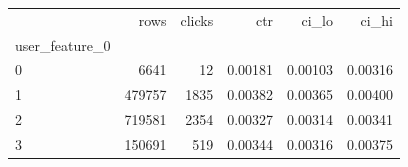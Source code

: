 \begin{tabular}{lrrrrr}
\toprule
 & rows & clicks & ctr & ci\_lo & ci\_hi \\
user\_feature\_0 &  &  &  &  &  \\
\midrule
0 & 6641 & 12 & 0.00181 & 0.00103 & 0.00316 \\
1 & 479757 & 1835 & 0.00382 & 0.00365 & 0.00400 \\
2 & 719581 & 2354 & 0.00327 & 0.00314 & 0.00341 \\
3 & 150691 & 519 & 0.00344 & 0.00316 & 0.00375 \\
\bottomrule
\end{tabular}
